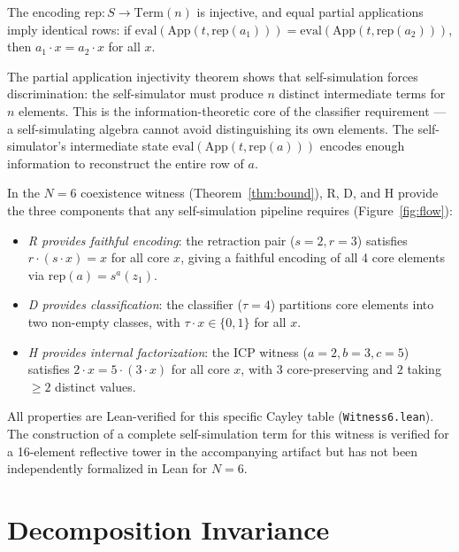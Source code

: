 \documentclass[a4paper,UKenglish,cleveref,autoref,thm-restate]{lipics-v2021}
\newcommand{\dotop}{\cdot}
\begin{document}
\begin{corollary}[Discrimination]
\label{cor:discrimination}
The encoding $\text{rep} : S \to \text{Term}(n)$ is injective, and equal partial applications imply identical rows: if $\text{eval}(\text{App}(t, \text{rep}(a_1))) = \text{eval}(\text{App}(t, \text{rep}(a_2)))$, then $a_1 \dotop x = a_2 \dotop x$ for all $x$.
\end{corollary}

The partial application injectivity theorem shows that self-simulation forces discrimination: the self-simulator must produce $n$ distinct intermediate terms for $n$ elements. This is the information-theoretic core of the classifier requirement --- a self-simulating algebra cannot avoid distinguishing its own elements. The self-simulator's intermediate state $\text{eval}(\text{App}(t, \text{rep}(a)))$ encodes enough information to reconstruct the entire row of $a$.

\begin{observation}
\label{obs:roles}
In the $N\!=\!6$ coexistence witness (Theorem~\ref{thm:bound}), R, D, and H provide the three components that any self-simulation pipeline requires (Figure~\ref{fig:flow}):
\begin{itemize}
  \item \emph{R provides faithful encoding}: the retraction pair ($s\!=\!2, r\!=\!3$) satisfies $r \dotop (s \dotop x) = x$ for all core $x$, giving a faithful encoding of all 4 core elements via $\text{rep}(a) = s^a(z_1)$.
  \item \emph{D provides classification}: the classifier ($\tau\!=\!4$) partitions core elements into two non-empty classes, with $\tau \dotop x \in \{0, 1\}$ for all $x$.
  \item \emph{H provides internal factorization}: the ICP witness ($a\!=\!2, b\!=\!3, c\!=\!5$) satisfies $2 \dotop x = 5 \dotop (3 \dotop x)$ for all core $x$, with $3$ core-preserving and $2$ taking $\geq 2$ distinct values.
\end{itemize}
All properties are Lean-verified for this specific Cayley table (\texttt{Witness6.lean}). The construction of a complete self-simulation term for this witness is verified for a 16-element reflective tower in the accompanying artifact but has not been independently formalized in Lean for $N\!=\!6$.
\end{observation}

\section{Decomposition Invariance}
\label{sec:invariance}
\end{document}
